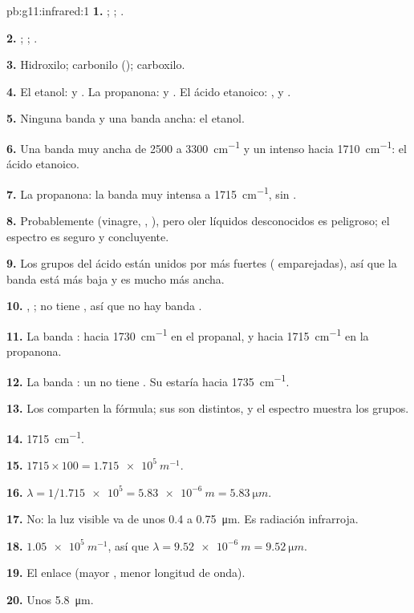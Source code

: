 \begin{solution}{pb:g11:infrared:1}
\textbf{1.} ; ; .

\textbf{2.} ; ; .

\textbf{3.} Hidroxilo; carbonilo (); carboxilo.

\textbf{4.} El etanol:  y . La propanona:  y
. El ácido etanoico: ,  y .

\textbf{5.} Ninguna banda  y una banda  ancha: el
etanol.

\textbf{6.} Una banda  muy ancha de 2500 a \qty{3300}{cm^{-1}}
y un  intenso hacia \qty{1710}{cm^{-1}}: el ácido etanoico.

\textbf{7.} La propanona: la banda  muy intensa a
\qty{1715}{cm^{-1}}, sin .

\textbf{8.} Probablemente (vinagre, , ), pero oler
líquidos desconocidos es peligroso; el espectro es seguro y concluyente.

\textbf{9.} Los grupos  del ácido están unidos por  más fuertes ( emparejadas), así que la banda está más
baja y es mucho más ancha.

\textbf{10.} , ; no tiene , así que no
hay banda .

\textbf{11.} La banda : hacia \qty{1730}{cm^{-1}} en el
propanal, y hacia \qty{1715}{cm^{-1}} en la propanona.

\textbf{12.} La banda : un  no tiene . Su 
estaría hacia \qty{1735}{cm^{-1}}.

\textbf{13.} Los  comparten la fórmula; sus 
son distintos, y el espectro muestra los grupos.

\textbf{14.} \qty{1715}{cm^{-1}}.

\textbf{15.} $1715 \times 100 = \qty{1.715e5}{m^{-1}}$.

\textbf{16.} $\lambda = 1/\num{1.715e5} = \qty{5.83e-6}{m} =
\qty{5.83}{\micro m}$.

\textbf{17.} No: la luz visible va de unos 0.4 a \qty{0.75}{\micro m}.
Es radiación infrarroja.

\textbf{18.} $\num{1.05e5}\ \si{m^{-1}}$, así que $\lambda = \qty{9.52e-6}{m}
= \qty{9.52}{\micro m}$.

\textbf{19.} El enlace  (mayor , menor longitud de
onda).

\textbf{20.} Unos \qty{5.8}{\micro m}.
\end{solution}
